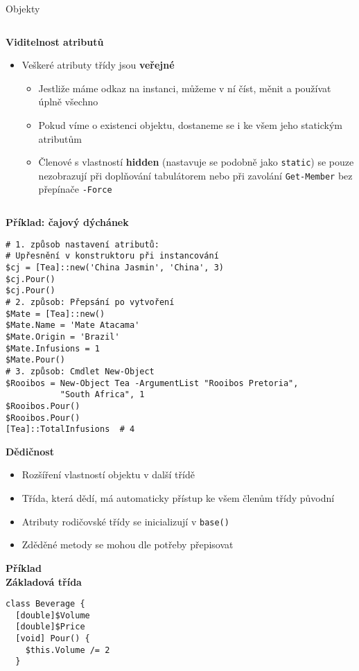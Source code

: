 \documentclass[main.tex]{subfiles}
\begin{document}
\begin{frame}{Objekty}
\begin{columns}[t]
\begin{column}{0.5\textwidth}
  \small\textbf{Viditelnost atributů}
  \begin{itemize}
    \item Veškeré atributy třídy jsou \textbf{veřejné}
      \begin{itemize}
        \item Jestliže máme odkaz na instanci, můžeme v ní číst, měnit a používat úplně všechno
        \item Pokud víme o existenci objektu, dostaneme se i ke všem jeho statickým atributům
        \item Členové s vlastností \textbf{hidden} (nastavuje se podobně jako \texttt{static}) se pouze nezobrazují při doplňování tabulátorem nebo při zavolání \texttt{Get-Member} bez přepínače \texttt{-Force}
      \end{itemize}
  \end{itemize}
\end{column}
\end{columns}
\framebreak
\textbf{Příklad: čajový dýchánek}
\begin{center}
\begin{verbatim}
# 1. způsob nastavení atributů:
# Upřesnění v konstruktoru při instancování
$cj = [Tea]::new('China Jasmin', 'China', 3)
$cj.Pour()
$cj.Pour()
# 2. způsob: Přepsání po vytvoření
$Mate = [Tea]::new()
$Mate.Name = 'Mate Atacama'
$Mate.Origin = 'Brazil'
$Mate.Infusions = 1
$Mate.Pour()
# 3. způsob: Cmdlet New-Object
$Rooibos = New-Object Tea -ArgumentList "Rooibos Pretoria",
           "South Africa", 1
$Rooibos.Pour()
$Rooibos.Pour()
[Tea]::TotalInfusions  # 4
\end{verbatim}
\end{center}
\framebreak
\textbf{Dědičnost}
\begin{itemize}
  \item Rozšíření vlastností objektu v další třídě
  \item Třída, která dědí, má automaticky přístup ke všem členům třídy původní
  \item Atributy rodičovské třídy se inicializují v \texttt{base()}
  \item Zděděné metody se mohou dle potřeby přepisovat
\end{itemize}
\framebreak
\textbf{Příklad\\Základová třída}
\begin{verbatim}
class Beverage {
  [double]$Volume
  [double]$Price
  [void] Pour() {
    $this.Volume /= 2
  }


\end{verbatim}
\end{frame}
\end{document}
